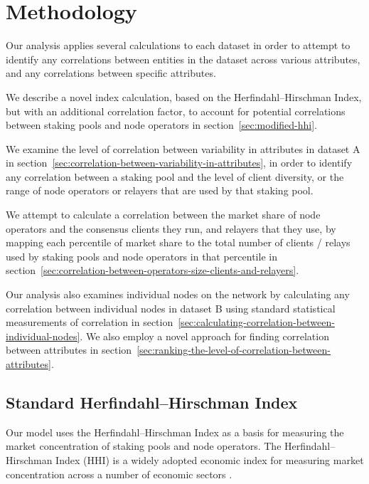 \documentclass[conference]{IEEEtran}
\begin{document}
\section{Methodology}
\label{sec:methodology}

Our analysis applies several calculations to each dataset in order to attempt to identify any correlations between entities in the dataset across various attributes, and any correlations between specific attributes.

We describe a novel index calculation, based on the Herfindahl–Hirschman Index, but with an additional correlation factor, to account for potential correlations between staking pools and node operators in section~\ref{sec:modified-hhi}.

We examine the level of correlation between variability in attributes in dataset A in section~\ref{sec:correlation-between-variability-in-attributes}, in order to identify any correlation between a staking pool and the level of client diversity, or the range of node operators or relayers that are used by that staking pool.

We attempt to calculate a correlation between the market share of node operators and the consensus clients they run, and relayers that they use, by mapping each percentile of market share to the total number of clients / relays used by staking pools and node operators in that percentile in section~\ref{sec:correlation-between-operators-size-clients-and-relayers}.

Our analysis also examines individual nodes on the network by calculating any correlation between individual nodes in dataset B using standard statistical measurements of correlation in section~\ref{sec:calculating-correlation-between-individual-nodes}.  We also employ a novel approach for finding correlation between attributes in section~\ref{sec:ranking-the-level-of-correlation-between-attributes}.

\subsection{Standard Herfindahl–Hirschman Index}
\label{sec:standard-hhi}

Our model uses the Herfindahl–Hirschman Index as a basis for measuring the market concentration of staking pools and node operators.  The Herfindahl–Hirschman Index (HHI) is a widely adopted economic index for measuring market concentration across a number of economic sectors \cite{OECD2021}.
\end{document}
